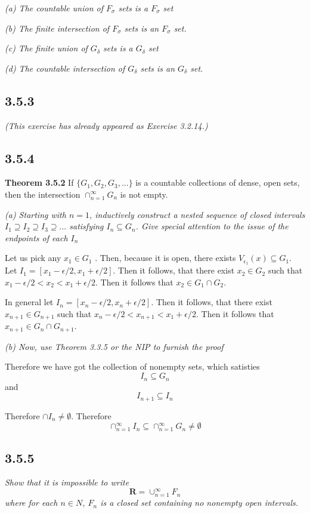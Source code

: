 \documentclass[11pt,oneside,titlepage]{book}
\begin{document}
\textit{(a) The countable union of $F_\sigma$ sets is a $F_\sigma$ set}

\textit{(b) The finite intersection of $F_\sigma$ sets is an $F_\sigma$ set.}

\textit{(c) The finite union of $G_\delta$ sets is a $G_\delta$ set}

\textit{(d) The countable intersection of $G_\delta$ sets is an $G_\delta$ set.}

\subsection*{3.5.3}
\textit{(This exercise has already appeared as Exercise 3.2.14.)}

\subsection*{3.5.4}
\textbf{Theorem 3.5.2}  If $\{G_1, G_2, G_3, ... \}$ is a countable collections of dense,
open sets, then the intersection $\cap_{n = 1}^{\infty} G_n $ is not empty.

\textit{(a) Starting with $n = 1$, inductively construct a nested sequence of
  closed intervals $I_1 \supseteq I_2 \supseteq I_3 \supseteq ... $
  satisfying $I_n \subseteq G_n$. Give special attention to the issue of the
  endpoints of each $I_n$}

Let us pick any $x_1 \in G_1$ . Then, because it is open, there exists
$V_{\epsilon_1}(x) \subseteq G_1$. Let
$I_1 = [x_1 - \epsilon / 2, x_1 + \epsilon / 2]$. Then it follows, that there
exist $x_2 \in G_2$ such that $x_1 - \epsilon / 2 < x_2 < x_1 + \epsilon / 2$.
Then it follows that $x_2 \in  G_1 \cap G_2$.

In general  let
$I_n = [x_n - \epsilon / 2, x_n + \epsilon / 2]$. Then it follows, that there
exist $x_{n + 1} \in G_{n + 1}$ such that
$x_n - \epsilon / 2 < x_{n + 1} < x_1 + \epsilon / 2$.
Then it follows that $x_{n + 1} \in  G_{n} \cap G_{n + 1}$.

\textit{(b) Now, use Theorem 3.3.5 or the NIP to furnish the proof}

Therefore we have got the collection of nonempty sets, which satisties
$$I_n \subseteq G_n$$
and
$$I_{n + 1} \subseteq I_n$$

Therefore $\cap I_n \neq \emptyset$. Therefore
$$\cap_{n = 1}^{\infty} I_n \subseteq
\cap_{n = 1}^{\infty} G_n \neq \emptyset$$

\subsection*{3.5.5}
\textit{Show that it is impossible to write}
$$\textbf{R} = \cup_{n = 1}^{\infty}F_n$$
\textit{where for each $n \in N$, $F_n$ is a closed set containing
  no nonempty open intervals.}
\end{document}
